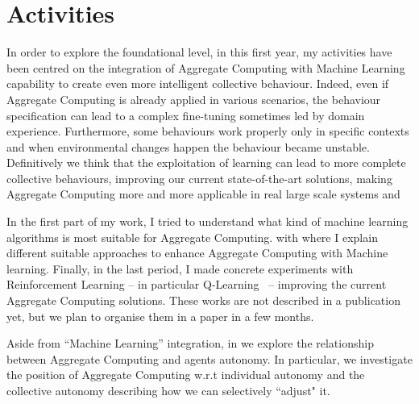 \documentclass[11pt]{article}
\begin{document}

\section{Activities}
In order to explore the foundational level, in this first year, 
 my activities have been centred on the integration of Aggregate Computing 
 with Machine Learning capability 
 to create even more intelligent collective behaviour.
%
Indeed, even if Aggregate Computing is already applied in various scenarios,
 the behaviour specification can lead to
 a complex fine-tuning sometimes led by domain experience.
%
Furthermore, some behaviours work properly only in specific contexts and when environmental
 changes happen the behaviour became unstable.
%
Definitively we think that the exploitation of 
 learning can lead to more complete collective behaviours, 
 improving our current state-of-the-art solutions, making Aggregate 
 Computing more and more applicable in real large scale systems
 and 

In the first part of my work, I tried to understand what 
 kind of machine learning algorithms is most suitable for Aggregate Computing.
%
 with \textit{} where I explain different suitable approaches
 to enhance Aggregate Computing with Machine learning.
%
Finally, in the last period, I made concrete experiments with 
 Reinforcement Learning -- in particular Q-Learning~\cite{watkins1992q} -- 
 improving the current Aggregate Computing solutions. 
 These works are not described in a publication yet, but we plan to organise them in a paper in a 
 few months.

Aside from ``Machine Learning'' integration, in \textit{} 
 we explore the relationship between Aggregate Computing and agents autonomy. In particular, 
 we investigate the position of Aggregate Computing w.r.t individual autonomy and the collective autonomy describing how we can selectively ``adjust" it. 
\end{document}
